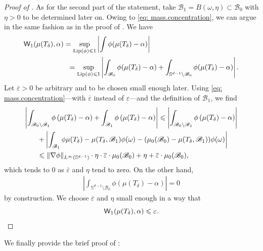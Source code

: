 \documentclass[a4paper,11pt]{article}
\theoremstyle{plain}
\renewcommand{\S}{\mathbb{S}^{d-1}}
\renewcommand{\leq}{\leqslant}
\numberwithin{equation}{section}
\begin{document}
\begin{proof}[Proof of ]
As for the second part of the statement, take $\mathscr{B}_1=B(\omega,\eta)\subset\mathscr{B}_0$ with $\eta>0$ to be determined later on.
Owing to \eqref{eq: mass.concentration}, we can argue in the same fashion as in the proof of . We have
\begin{align*}
\mathsf{W}_1(\mu(T_\delta),\alpha) &= \sup_{\mathrm{Lip}(\phi)\leq 1}\left|\int\phi(\mu(T_\delta)-\alpha)\right|\\
    &\hspace{0.2cm}= \sup_{\mathrm{Lip}(\phi)\leq 1}\left|\int_{\mathscr{B}_0}\phi(\mu(T_\delta)- \alpha)+\int_{\S\setminus \mathscr{B}_0}\phi(\mu(T_\delta)-\alpha)\right|.
\end{align*}
Let $\overline{\varepsilon}>0$ be arbitrary and to be chosen small enough later.
Using \eqref{eq: mass.concentration}---with $\overline{\varepsilon}$ instead of $\varepsilon$---and the definition of $\mathscr{B}_1$, we find  
\begin{align*}
    \left|\int_{\mathscr{B}_0\setminus\mathscr{B}_1} \phi \left(\mu(T_\delta) -\alpha\right)+ \int_{\mathscr{B}_1} \phi \left(\mu(T_\delta) -\alpha\right)\right|&\leq \left|\int_{\mathscr{B}_0\setminus\mathscr{B}_1} \phi \left(\mu(T_\delta) -\alpha\right)\right|\\
      &\hspace{-6cm}+ \left|\int_{\mathscr{B}_1} \phi \mu(T_\delta) -  \mu(T_\delta,\mathscr{B}_1)\phi(\omega)-(\mu_0(\mathscr{B}_0)-\mu(T_\delta,\mathscr{B}_1))\phi(\omega)\right|\\ &\hspace{-6cm}\leq\|\nabla\phi\|_{L^\infty(\S)}\cdot\eta\cdot\overline{\varepsilon}\cdot\mu_0(\mathscr{B}_0)+\eta+\overline{\varepsilon}\cdot\mu_0(\mathscr{B}_0),
\end{align*}
which tends to $0$ as $\overline{\varepsilon}$ and $\eta$ tend to zero.
On the other hand,
\begin{align*}
    \left|\int_{\S\setminus\mathscr{B}_0}\phi(\mu(T_\delta)-\alpha)\right|=0
\end{align*}
by construction.
We choose $\overline{\varepsilon}$ and $\eta$ small enough in a way that
\begin{equation*}
    \mathsf{W}_1(\mu(T_\delta),\alpha)\leq \varepsilon.\qedhere
\end{equation*}
\end{proof}

We finally provide the brief proof of :
\end{document}
